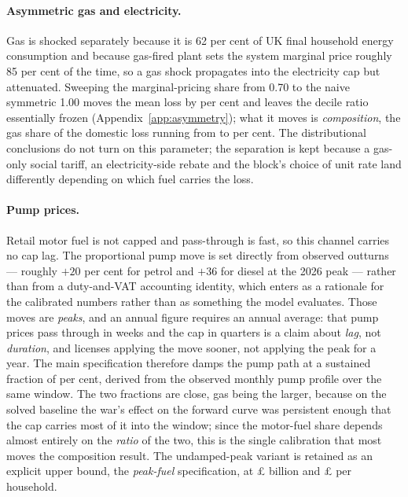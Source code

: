 \paragraph{Asymmetric gas and electricity.} Gas is shocked separately because it is 62 per cent of UK final household energy consumption \citep{desnz2025ecuk} and because gas-fired plant sets the system marginal price roughly 85 per cent of the time, so a gas shock propagates into the electricity cap but attenuated. Sweeping the marginal-pricing share from 0.70 to the naive symmetric 1.00 moves the mean loss by \genAsymMeanShiftPct{} per cent and leaves the decile ratio essentially frozen (Appendix~\ref{app:asymmetry}); what it moves is \emph{composition}, the gas share of the domestic loss running from \genGasShareDomesticLow{} to \genGasShareDomesticHigh{} per cent. The distributional conclusions do not turn on this parameter; the separation is kept because a gas-only social tariff, an electricity-side rebate and the block's choice of unit rate land differently depending on which fuel carries the loss.

\paragraph{Pump prices.} Retail motor fuel is not capped and pass-through is fast, so this channel carries no cap lag. The proportional pump move is set directly from observed outturns --- roughly $+20$ per cent for petrol and $+36$ for diesel at the 2026 peak --- rather than from a duty-and-VAT accounting identity, which enters as a rationale for the calibrated numbers rather than as something the model evaluates. Those moves are \emph{peaks}, and an annual figure requires an annual average: that pump prices pass through in weeks and the cap in quarters is a claim about \emph{lag}, not \emph{duration}, and licenses applying the move sooner, not applying the peak for a year. The main specification therefore damps the pump path at a sustained fraction of \genPumpSustainedFraction{} per cent, derived from the observed monthly pump profile over the same window. The two fractions are close, gas being the larger, because on the solved baseline the war's effect on the forward curve was persistent enough that the cap carries most of it into the window; since the motor-fuel share depends almost entirely on the \emph{ratio} of the two, this is the single calibration that most moves the composition result. The undamped-peak variant is retained as an explicit upper bound, the \emph{peak-fuel} specification, at \pounds \genPeakFuelAggBn{} billion and \pounds \genPeakFuelLossMean{} per household.

